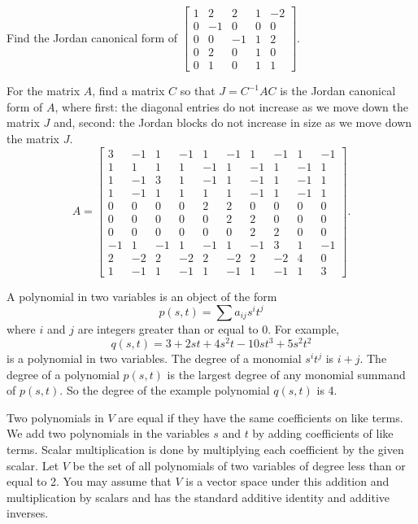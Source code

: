 \item Find the Jordan canonical form of $\left[ \begin{array}{crrcr} 1&2&2&1&-2\\0&-1&0&0&0 \\ 0&0&-1&1&2 \\ 0&2&0&1&0 \\ 0&1&0&1&1 \end{array} \right]$. 

\item For the matrix $A$, find a matrix $C$ so that $J = C^{-1}AC$ is the Jordan canonical form of $A$, where first: the diagonal entries do not increase as we move down the matrix $J$ and, second: the Jordan blocks do not increase in size as we move down the matrix $J$. 
\[A =  \left[ \begin{array}{rrrrrrrrrr} 
3&-1&1&-1&1&-1&1&-1&1&-1 \\ 
1&1&1&1&-1&1&-1&1&-1&1 \\ 
1&-1&3&1&-1&1&-1&1&-1&1\\ 
1&-1&1&1&1&1&-1&1&-1&1  \\ 
0&0&0&0&2&2&0&0&0&0 \\ 
0&0&0&0&0&2&2&0&0&0\\ 
0&0&0&0&0&0&2&2&0&0\\ 
-1&1&-1&1&-1&1&-1&3&1&-1\\ 
2&-2&2&-2&2&-2&2&-2&4&0\\ 
1&-1&1&-1&1&-1&1&-1&1&3
\end{array} \right].\]

\item A polynomial in two variables is an object of the form
\[p(s,t) = \sum a_{ij}s^it^j\]
where $i$ and $j$ are integers greater than or equal to 0. For example, 
\[q(s,t) = 3 + 2st + 4s^2t - 10st^3+5s^2t^2\]
is a polynomial in two variables. The degree of a monomial $s^it^j$ is $i+j$. The degree of a polynomial $p(s,t)$ is the largest degree of any monomial summand of $p(s,t)$. So the degree of the example polynomial $q(s,t)$ is 4. 

Two polynomials in $V$ are equal if they have the same coefficients on like terms. We add two polynomials in the variables $s$ and $t$ by adding coefficients of like terms. Scalar multiplication is done by multiplying each coefficient by the given scalar. Let $V$ be the set of all polynomials of two variables of degree less than or equal to 2. You may assume that $V$ is a vector space under this addition and multiplication by scalars and has the standard additive identity and additive inverses. 

